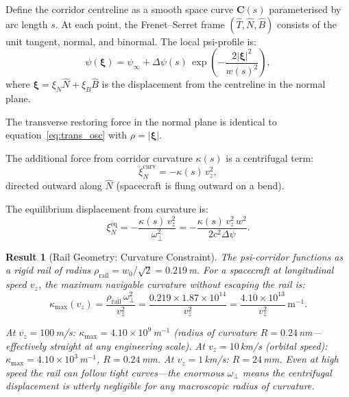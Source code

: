 \documentclass[aps,prd,twocolumn,superscriptaddress]{revtex4-2}
\newtheorem{result}{Result}
\begin{document}
Define the corridor centreline as a smooth space curve $\mathbf{C}(s)$
parameterised by arc length $s$.  At each point, the Frenet--Serret
frame $(\hat{T}, \hat{N}, \hat{B})$ consists of the unit tangent,
normal, and binormal.  The local psi-profile is:
\begin{equation}
\psi(\bm{\xi}) = \psi_\infty + \Delta\psi(s)\,\exp\!\left(-\frac{2|\bm{\xi}|^2}{w(s)^2}\right),
\label{eq:psi_frenet}
\end{equation}
where $\bm{\xi} = \xi_N\hat{N} + \xi_B\hat{B}$ is the displacement
from the centreline in the normal plane.

The transverse restoring force in the normal plane is identical to
equation~\eqref{eq:trans_osc} with $\rho = |\bm{\xi}|$.

The additional force from corridor curvature $\kappa(s)$ is a centrifugal
term:
\begin{equation}
\ddot{\xi}_N^\mathrm{curv} = -\kappa(s)\,v_z^2,
\label{eq:centrifugal}
\end{equation}
directed outward along $\hat{N}$ (spacecraft is flung outward on a bend).

The equilibrium displacement from curvature is:
\begin{equation}
\xi_N^\mathrm{eq} = -\frac{\kappa(s)\,v_z^2}{\omega_\perp^2}
= -\frac{\kappa(s)\,v_z^2\,w^2}{2c^2\Delta\psi}.
\label{eq:xi_eq}
\end{equation}

\begin{result}[Rail Geometry: Curvature Constraint]
The psi-corridor functions as a rigid rail of radius
$\rho_\mathrm{rail} = w_0/\sqrt{2} = 0.219$\,m.  For a spacecraft at
longitudinal speed $v_z$, the maximum navigable curvature without
escaping the rail is:
\begin{equation}
\kappa_\mathrm{max}(v_z) = \frac{\rho_\mathrm{rail}\,\omega_\perp^2}{v_z^2}
= \frac{0.219\times1.87\times10^{14}}{v_z^2}
= \frac{4.10\times10^{13}}{v_z^2}\,\mathrm{m}^{-1}.
\label{eq:kappa_max}
\end{equation}

At $v_z = 100$\,m/s: $\kappa_\mathrm{max} = 4.10\times10^9$\,m$^{-1}$
(radius of curvature $R = 0.24$\,nm---effectively straight at any
engineering scale).  At $v_z = 10$\,km/s (orbital speed):
$\kappa_\mathrm{max} = 4.10\times10^3$\,m$^{-1}$, $R = 0.24$\,mm.
At $v_z = 1$\,km/s: $R = 24$\,mm.  Even at high speed the rail
can follow tight curves---the enormous $\omega_\perp$ means the
centrifugal displacement is utterly negligible for any macroscopic
radius of curvature.
\end{result}
\end{document}

